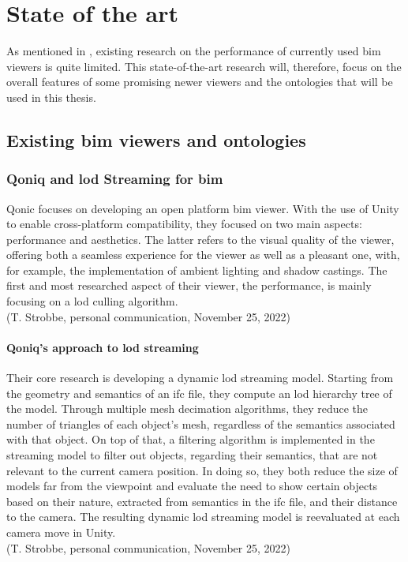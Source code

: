 \chapter{State of the art}
As mentioned in \cite{Johansson2015}, existing research on the performance of currently used \ac{bim} viewers is quite limited. This state-of-the-art research will, therefore, focus on the overall features of some promising newer viewers and the ontologies that will be used in this thesis.

\section{Existing \acs{bim} viewers and ontologies}
\subsection{Qoniq and \acs{lod} Streaming for \acs{bim}}
Qonic focuses on developing an open platform \ac{bim} viewer. With the use of Unity to enable cross-platform compatibility, they focused on two main aspects: performance and aesthetics. The latter refers to the visual quality of the viewer, offering both a seamless experience for the viewer as well as a pleasant one, with, for example, the implementation of ambient lighting and shadow castings. The first and most researched aspect of their viewer, the performance, is mainly focusing on a \ac{lod} culling algorithm.
\\(T. Strobbe, personal communication, November 25, 2022)

\subsubsection{Qoniq's approach to \acs{lod} streaming}
Their core research is developing a dynamic \ac{lod} streaming model. Starting from the geometry and semantics of an \ac{ifc} file, they compute an \ac{lod} hierarchy tree of the model. Through multiple mesh decimation algorithms, they reduce the number of triangles of each object's mesh, regardless of the semantics associated with that object. On top of that, a filtering algorithm is implemented in the streaming model to filter out objects, regarding their semantics, that are not relevant to the current camera position. In doing so, they both reduce the size of models far from the viewpoint and evaluate the need to show certain objects based on their nature, extracted from semantics in the \ac{ifc} file, and their distance to the camera. The resulting dynamic \ac{lod} streaming model is reevaluated at each camera move in Unity.
\\(T. Strobbe, personal communication, November 25, 2022)

